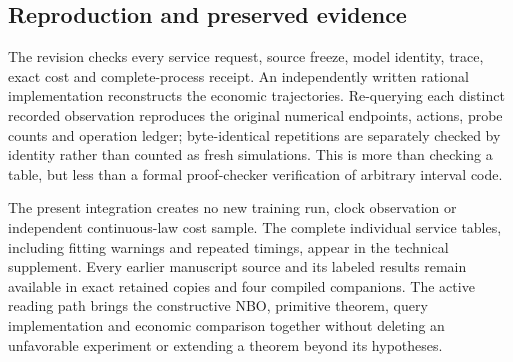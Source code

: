 \subsection{Reproduction and preserved evidence}
The revision checks every service request, source freeze, model identity, trace, exact cost and complete-process receipt. An independently written rational implementation reconstructs the economic trajectories. Re-querying each distinct recorded observation reproduces the original numerical endpoints, actions, probe counts and operation ledger; byte-identical repetitions are separately checked by identity rather than counted as fresh simulations. This is more than checking a table, but less than a formal proof-checker verification of arbitrary interval code.

The present integration creates no new training run, clock observation or independent continuous-law cost sample. The complete individual service tables, including fitting warnings and repeated timings, appear in the technical supplement. Every earlier manuscript source and its labeled results remain available in exact retained copies and four compiled companions. The active reading path brings the constructive NBO, primitive theorem, query implementation and economic comparison together without deleting an unfavorable experiment or extending a theorem beyond its hypotheses.
